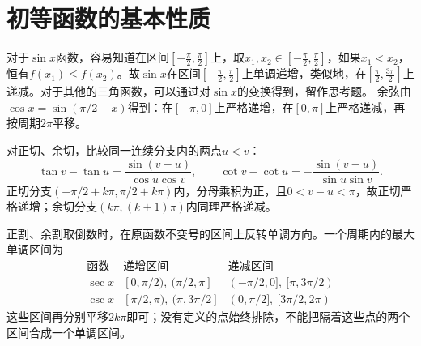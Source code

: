 \par\addvspace{12pt}

\section{初等函数的基本性质}

\label{sol:sec:functions:4}

对于\(\sin x\)函数，容易知道在区间\(\left[ - \frac{\pi}{2} , \frac{\pi}{2} \right]\)上，取\(x_{1} , x_{2} \in \left[ - \frac{\pi}{2} , \frac{\pi}{2} \right]\)，如果\(x_{1} < x_{2}\)，恒有\(f(x_{1}) \le f(x_{2})\)。故\(\sin x\)在区间\(\left[ - \frac{\pi}{2} , \frac{\pi}{2} \right]\)上单调递增，类似地，在\(\left[ \frac{\pi}{2} , \frac{3 \pi}{2} \right]\)上递减。对于其他的三角函数，可以通过对\(\sin x\)的变换得到，留作思考题。
\solutionanswer
余弦由\(\cos x=\sin(\pi/2-x)\)得到：在\([-\pi,0]\)上严格递增，在\([0,\pi]\)上严格递减，再按周期\(2\pi\)平移。

对正切、余切，比较同一连续分支内的两点\(u<v\)：
\[
\tan v-\tan u=\frac{\sin(v-u)}{\cos u\cos v},\qquad
\cot v-\cot u=-\frac{\sin(v-u)}{\sin u\sin v}.
\]
正切分支\((-\pi/2+k\pi,\pi/2+k\pi)\)内，分母乘积为正，且\(0<v-u<\pi\)，故正切严格递增；余切分支\((k\pi,(k+1)\pi)\)内同理严格递减。

正割、余割取倒数时，在原函数不变号的区间上反转单调方向。一个周期内的最大单调区间为
\[
\begin{array}{c|c|c}
\text{函数}&\text{递增区间}&\text{递减区间}\\\hline
\sec x&[0,\pi/2),\ (\pi/2,\pi]&(-\pi/2,0],\ [\pi,3\pi/2)\\
\csc x&[\pi/2,\pi),\ (\pi,3\pi/2]&(0,\pi/2],\ [3\pi/2,2\pi)
\end{array}
\]
这些区间再分别平移\(2k\pi\)即可；没有定义的点始终排除，不能把隔着这些点的两个区间合成一个单调区间。
\par
